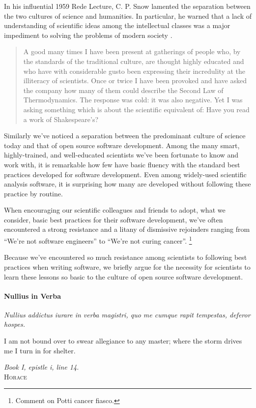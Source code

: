 \documentclass[ChapterTOCs,krantz2]{krantz} %
\begin{document}
In his influential 1959 Rede Lecture, C. P. Snow lamented the separation between the
two cultures of science and humanities.  In particular, he warned that a lack
of understanding of scientific ideas among the intellectual classes was a major
impediment to solving the problems of modern society \cite{snow1960two}.

\begin{quote}
A good many times I have been present at gatherings of people who, by the
standards of the traditional culture, are thought highly educated and who have
with considerable gusto been expressing their incredulity at the illiteracy of
scientists. Once or twice I have been provoked and have asked the company how
many of them could describe the Second Law of Thermodynamics. The response was
cold: it was also negative. Yet I was asking something which is about the
scientific equivalent of: Have you read a work of Shakespeare’s?
\end{quote}

Similarly we've noticed a separation between the predominant culture of
science today and that of open source software development. Among the
many smart, highly-trained, and well-educated scientists we've been
fortunate to know and work with, it is remarkable how few have basic
fluency with the standard best practices developed for software development.
Even among widely-used scientific analysis software, it is surprising how
many are developed without following these practice by routine.

When encouraging our scientific colleagues and friends to adopt, what we
consider, basic best practices for their software development, we've often
encountered a strong resistance and a litany of dismissive rejoinders ranging
from ``We're not software engineers'' to ``We're not curing cancer''.%
\footnote{Comment on Potti cancer fiasco.}

Because we've encountered so much resistance among scientists to following best
practices when writing software, we briefly argue for the necessity for
scientists to learn these lessons so basic to the culture of open source
software development.

\paragraph{ {\bf Nullius in Verba}} 

\setlength{\epigraphrule}{0pt}
\setlength{\epigraphwidth}{.65\textwidth}
\epigraph%
{%
  \emph{Nullius addictus iurare in verba magistri,
  quo me cumque rapit tempestas, deferor hospes.}

  I am not bound over to swear allegiance to any master; where the storm
  drives me I turn in for shelter.
}%
{\textit{Book I, epistle i, line 14.}\\ \textsc{Horace} }
\end{document}
